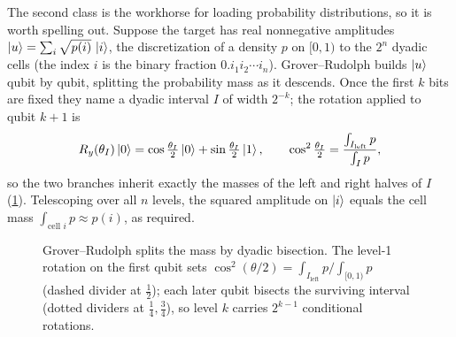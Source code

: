 \begin{remark}
\label{rem:lec06-gr}
The second class is the workhorse for loading probability distributions, so it is
worth spelling out. Suppose the target has real nonnegative amplitudes
$\ket{u}=\sum_{i}\sqrt{p(i)}\,\ket{i}$, the discretization of a density $p$ on
$[0,1)$ to the $2^{n}$ dyadic cells (the index $i$ is the binary fraction
$0.i_1i_2\cdots i_n$). Grover--Rudolph builds $\ket{u}$ qubit by qubit, splitting the
probability mass as it descends. Once the first $k$ bits are fixed they name a dyadic
interval $I$ of width $2^{-k}$; the rotation applied to qubit $k{+}1$ is
\[
  R_y(\theta_I)\ket0=\cos\tfrac{\theta_I}{2}\ket0+\sin\tfrac{\theta_I}{2}\ket1,
  \qquad
  \cos^{2}\tfrac{\theta_I}{2}=\frac{\int_{I_{\mathrm{left}}}p}{\int_{I}p},
\]
so the two branches inherit exactly the masses of the left and right halves of $I$
(\cref{fig:lec06-gr}). Telescoping over all $n$ levels, the squared amplitude on
$\ket i$ equals the cell mass $\int_{\text{cell }i}p\approx p(i)$, as required.
\begin{figure}[ht]
\centering
{}
\caption{Grover--Rudolph splits the mass by dyadic bisection. The level-1 rotation on
the first qubit sets $\cos^2(\theta/2)=\int_{I_{\mathrm{left}}}p\big/\int_{[0,1)}p$
(dashed divider at $\tfrac12$); each later qubit bisects the surviving interval (dotted
dividers at $\tfrac14,\tfrac34$), so level $k$ carries $2^{k-1}$ conditional rotations.}
\label{fig:lec06-gr}
\end{figure}


\end{remark}

